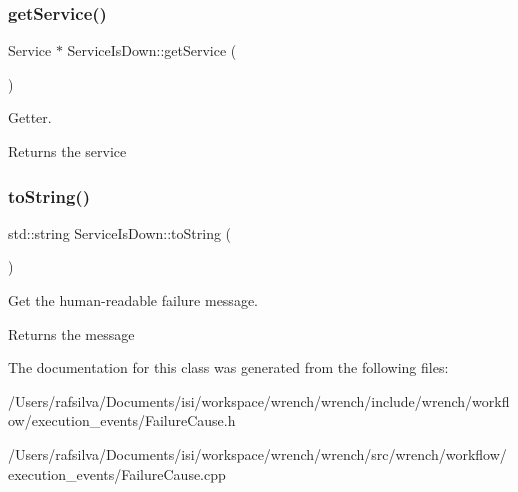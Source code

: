 \subsubsection{\texorpdfstring{get\+Service()}{getService()}}
{\footnotesize\ttfamily Service $\ast$ Service\+Is\+Down\+::get\+Service (\begin{DoxyParamCaption}{ }\end{DoxyParamCaption})}



Getter. 

\begin{DoxyReturn}{Returns}
the service 
\end{DoxyReturn}
\mbox{\label{class_service_is_down_a365459d355d47c6c7b3187ce954afcb8}} 
\subsubsection{\texorpdfstring{to\+String()}{toString()}}
{\footnotesize\ttfamily std\+::string Service\+Is\+Down\+::to\+String (\begin{DoxyParamCaption}{ }\end{DoxyParamCaption})\hspace{0.3cm}{\ttfamily [override]}}



Get the human-\/readable failure message. 

\begin{DoxyReturn}{Returns}
the message 
\end{DoxyReturn}


The documentation for this class was generated from the following files\+:\begin{DoxyCompactItemize}
\item 
/\+Users/rafsilva/\+Documents/isi/workspace/wrench/wrench/include/wrench/workflow/execution\+\_\+events/Failure\+Cause.\+h\item 
/\+Users/rafsilva/\+Documents/isi/workspace/wrench/wrench/src/wrench/workflow/execution\+\_\+events/Failure\+Cause.\+cpp\end{DoxyCompactItemize}
